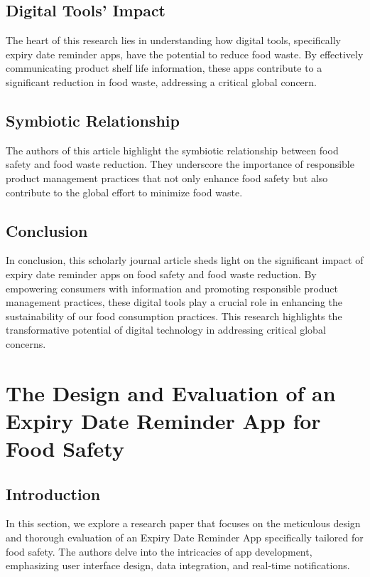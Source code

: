 \subsection{Digital Tools' Impact}
The heart of this research lies in understanding how digital tools, specifically expiry date reminder apps, have the potential to reduce food waste. By effectively communicating product shelf life information, these apps contribute to a significant reduction in food waste, addressing a critical global concern.

\subsection{Symbiotic Relationship}
The authors of this article highlight the symbiotic relationship between food safety and food waste reduction. They underscore the importance of responsible product management practices that not only enhance food safety but also contribute to the global effort to minimize food waste.

\subsection{Conclusion}
In conclusion, this scholarly journal article sheds light on the significant impact of expiry date reminder apps on food safety and food waste reduction. By empowering consumers with information and promoting responsible product management practices, these digital tools play a crucial role in enhancing the sustainability of our food consumption practices. This research highlights the transformative potential of digital technology in addressing critical global concerns.



\section{The Design and Evaluation of an Expiry Date Reminder App for Food Safety}

\subsection{Introduction}
In this section, we explore a research paper that focuses on the meticulous design and thorough evaluation of an Expiry Date Reminder App specifically tailored for food safety. The authors delve into the intricacies of app development, emphasizing user interface design, data integration, and real-time notifications.

